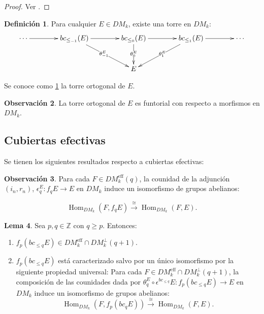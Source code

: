 \documentclass[10pt]{amsart}
\theoremstyle{definition}
\newtheorem{definition}{Definici\'on}[section]
\newtheorem{obs}[definition]{Observaci\'on}
\newtheorem{lemma}[definition]{Lema}
\theoremstyle{remark}
\theoremstyle{definition}
\begin{document}
\begin{proof}
Ver \cite[Prop. 3.2.4 y Cor. 3.2.7]{Pel17}.
\end{proof}

\begin{definition} Para cualquier $E \in DM_{k}$, existe una torre en $DM_{k}$:
$$\xymatrix@R=10mm@C=14mm{
\cdots
\ar@{->}[r]^{}
&
bc_{\leq_{-1}}(E)
\ar@{->}[r]^{} 
\ar@{->}[dr]|{\theta_{-1}^{E}} 
&
bc_{\leq_{0}}(E)
\ar@{->}[r]
\ar@{->}[d]|{\theta_{0}^{E}}
&
bc_{\leq_{1}}(E) 
\ar@{->}[dl]|{\theta_{1}^{E}} 
\ar@{->}[r]
&
\cdots
\\
&
&
E 
&
&
}$$\label{tbE}


Se conoce como \ref{tbE} la torre ortogonal de $E$.
\end{definition}

\begin{obs}
La torre ortogonal de $E$ es funtorial con respecto a morfismos en $DM_{k}$.
\end{obs}


\subsection{Cubiertas efectivas}
Se tienen los siguientes resultados respecto a cubiertas efectivas:
\begin{obs}
 Para cada $F \in DM^{\textrm{eff}}_{k}(q)$, la counidad de la adjunci\'on $(i_{n},r_{n})$, $\epsilon^{E}_{q}:f_{q}E \rightarrow E$ en $DM_{k}$ induce un isomorfismo de grupos abelianos:

\begin{equation*}
\operatorname{Hom}_{DM_{k}}(F,f_{q}E)   \stackrel{\cong}{\rightarrow} \operatorname{Hom}_{DM_{k}}(F,E).
\end{equation*}
\end{obs}

\begin{lemma}
Sea $p,q \in \mathbb{Z}$ con $q\geq p$. Entonces:
\begin{enumerate}
\item $f_{p}(bc_{\leq q} E) \in DM_{k}^{\textrm{eff}} \cap DM^{\perp}_{k}(q+1)$.
\item $f_{p}(bc_{\leq q} E)$ est\'a caracterizado salvo por un \'unico isomorfismo por la siguiente propiedad universal:
Para cada $F \in DM^{\textrm{eff}}_{k} \cap DM^{\perp}_{k}(q+1)$, la composici\'on de las counidades dada por $\theta^{E}_{q} \circ \epsilon^{bc_{\leq q}}E:f_{p}(bc_{\leq q} E) \rightarrow E$ en $DM_{k}$ induce un isomorfismo de grupos abelianos:
\begin{equation*}
\operatorname{Hom}_{DM_{k}}(F,f_{p}(bc_{q}E))  \stackrel{\cong}{\rightarrow} \operatorname{Hom}_{DM_{k}}(F,E).
\end{equation*}
\end{enumerate}
\end{lemma}
\end{document}
